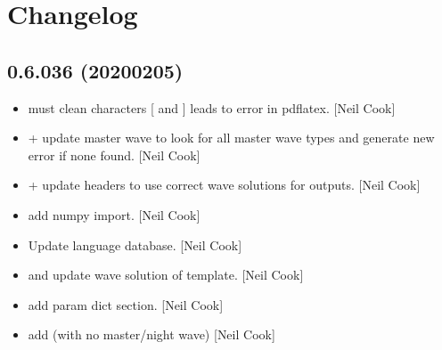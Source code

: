 \documentclass[a4paper,10pt,english]{report}
\begin{document}
\section{Changelog}
\label{\detokenize{misc/changelog:changelog}}\label{\detokenize{misc/changelog::doc}}

\subsection{0.6.036 (2020\sphinxhyphen{}02\sphinxhyphen{}05)}
\label{\detokenize{misc/changelog:id1}}\begin{itemize}
\item {} 
 \sphinxhyphen{} must clean characters {[} and {]} \sphinxhyphen{} leads to error in
pdflatex. {[}Neil Cook{]}

\item {} 
 +  \sphinxhyphen{} update master wave to
look for all master wave types and generate new error if none found.
{[}Neil Cook{]}

\item {} 
 +  \sphinxhyphen{}
update headers to use correct wave solutions for outputs. {[}Neil Cook{]}

\item {} 
 \sphinxhyphen{} add numpy import. {[}Neil Cook{]}

\item {} 
Update language database. {[}Neil Cook{]}

\item {} 
 and
 \sphinxhyphen{} update wave solution of template. {[}Neil
Cook{]}

\item {} 
 \sphinxhyphen{} add param dict section. {[}Neil Cook{]}

\item {} 
 \sphinxhyphen{} add  (with no master/night wave)
{[}Neil Cook{]}

\end{itemize}
\end{document}
